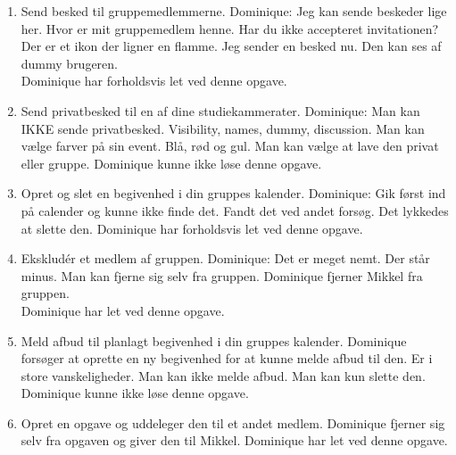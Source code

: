 \documentclass[12pt]{article}
\begin{document}
\begin{enumerate}
\item Send besked til gruppemedlemmerne.
Dominique: Jeg kan sende beskeder lige her. Hvor er mit gruppemedlem henne. Har du ikke accepteret invitationen? Der er et ikon der ligner en flamme. Jeg sender en besked nu. Den kan ses af dummy brugeren.\\
Dominique har forholdsvis let ved denne opgave.

\item Send privatbesked til en af dine studiekammerater.
Dominique: Man kan IKKE sende privatbesked. Visibility, names, dummy, discussion. Man kan vælge farver på sin event. Blå, rød og gul. Man kan vælge at lave den privat eller gruppe.
Dominique kunne ikke løse denne opgave.\\

\item Opret og slet en begivenhed i din gruppes kalender.
Dominique: Gik først ind på calender og kunne ikke finde det. Fandt det ved andet forsøg. Det lykkedes at slette den.
Dominique har forholdsvis let ved denne opgave.\\

\item Ekskludér et medlem af gruppen.
Dominique: Det er meget nemt. Der står minus. Man kan fjerne sig selv fra gruppen. Dominique fjerner Mikkel fra gruppen.\\
Dominique har let ved denne opgave.

\item Meld afbud til planlagt begivenhed i din gruppes kalender.
Dominique forsøger at oprette en ny begivenhed for at kunne melde afbud til den. Er i store vanskeligheder. Man kan ikke melde afbud. Man kan kun slette den.\\
Dominique kunne ikke løse denne opgave.\\

\item Opret en opgave og uddeleger den til et andet medlem.
Dominique fjerner sig selv fra opgaven og giver den til Mikkel.
Dominique har let ved denne opgave.\\

\end{enumerate}
\newpage
{}

\end{document}
